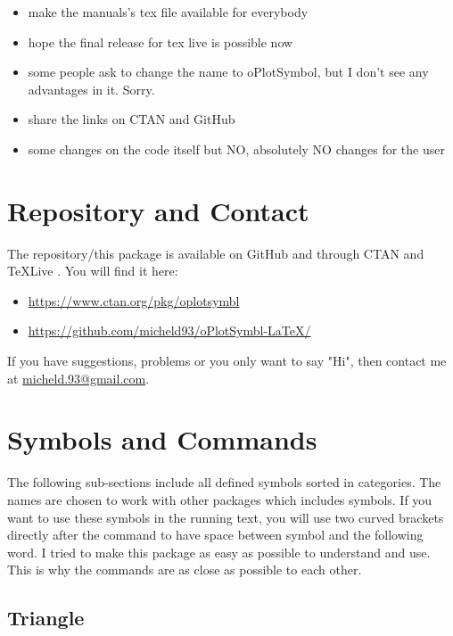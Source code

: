 \documentclass[a4paper,parskip=half,bibtotoc,11pt]{scrartcl}
\begin{document}
\begin{itemize}
    \item make the manuals's tex file available for everybody
    \item hope the final release for tex live is possible now
    \item some people ask to change the name to oPlotSymbol, but I don't see any advantages in it. Sorry.
    \item share the links on CTAN and GitHub
    \item some changes on the code itself but NO, absolutely NO changes for the user 
\end{itemize}


\section{Repository and Contact}

The repository/this package is available on GitHub and through CTAN \cite{ctan} and TeXLive \cite{texlive}. You will find it here:


\begin{itemize}
    \item \url{https://www.ctan.org/pkg/oplotsymbl}
    \item \url{https://github.com/micheld93/oPlotSymbl-LaTeX/}  
\end{itemize}


If you have suggestions, problems or you only want to say "Hi", then contact me at \href{mailto:micheld.93@ gmail.com}{micheld.93@gmail.com}.


\section{Symbols and Commands}

The following sub-sections include all defined symbols sorted in categories. The names are chosen to work with other packages which includes symbols. If you want to use these symbols in the running text, you will use two curved brackets directly after the command to have space between symbol and the following word. I tried to make this package as easy as possible to understand and use. This is why the commands are as close as possible to each other.  


\subsection{Triangle}
\end{document}

